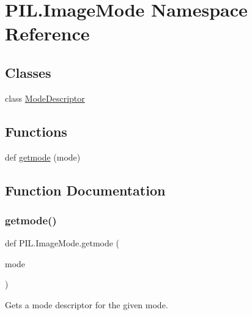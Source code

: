 \hypertarget{namespacePIL_1_1ImageMode}{}\section{P\+I\+L.\+Image\+Mode Namespace Reference}
\label{namespacePIL_1_1ImageMode}
\subsection*{Classes}
\begin{DoxyCompactItemize}
\item 
class \hyperlink{classPIL_1_1ImageMode_1_1ModeDescriptor}{Mode\+Descriptor}
\end{DoxyCompactItemize}
\subsection*{Functions}
\begin{DoxyCompactItemize}
\item 
def \hyperlink{namespacePIL_1_1ImageMode_aa964afd5c2a39015cd877c881d57c731}{getmode} (mode)
\end{DoxyCompactItemize}


\subsection{Function Documentation}
\mbox{\label{namespacePIL_1_1ImageMode_aa964afd5c2a39015cd877c881d57c731}} 
\subsubsection{\texorpdfstring{getmode()}{getmode()}}
{\footnotesize\ttfamily def P\+I\+L.\+Image\+Mode.\+getmode (\begin{DoxyParamCaption}\item[{}]{mode }\end{DoxyParamCaption})}

\begin{DoxyVerb}Gets a mode descriptor for the given mode.\end{DoxyVerb}
 